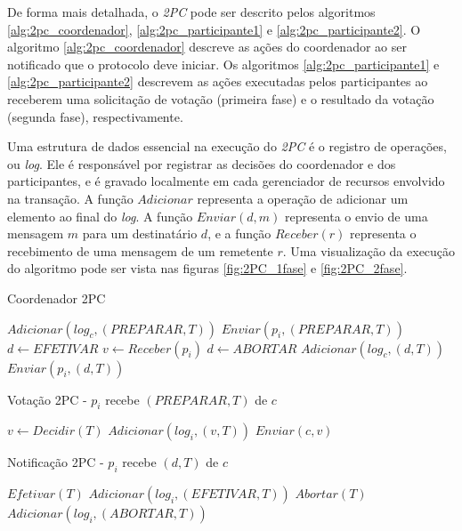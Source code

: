 \documentclass[11pt,twoside,a4paper]{book}
\begin{document}
De forma mais detalhada, o \emph{2PC} pode ser descrito pelos algoritmos \ref{alg:2pc_coordenador}, \ref{alg:2pc_participante1} e \ref{alg:2pc_participante2}. O algoritmo \ref{alg:2pc_coordenador} descreve as ações do coordenador ao ser notificado que o protocolo deve iniciar. Os algoritmos \ref{alg:2pc_participante1} e \ref{alg:2pc_participante2} descrevem as ações executadas pelos participantes ao receberem uma solicitação de votação (primeira fase) e o resultado da votação (segunda fase), respectivamente. 

Uma estrutura de dados essencial na execução do \emph{2PC} é o registro de operações, ou \emph{log}. Ele é responsável por registrar as decisões do coordenador e dos participantes, e é gravado localmente em cada gerenciador de recursos envolvido na transação. A função $Adicionar$ representa a operação de adicionar um elemento ao final do \emph{log}. A função $Enviar(d, m)$ representa o envio de uma mensagem $m$ para um destinatário $d$, e a função $Receber(r)$ representa o recebimento de uma mensagem de um remetente $r$. Uma visualização da execução do algoritmo pode ser vista nas figuras \ref{fig:2PC_1fase} e \ref{fig:2PC_2fase}.

\begin{algorithm}
\caption{Coordenador 2PC}
\label{alg:2pc_coordenador}
\begin{algorithmic}[1]
\State $Adicionar(log_c, (PREPARAR, T))$
	\State $Enviar(p_i, (PREPARAR, T))$
\EndFor
\State $d \gets EFETIVAR$
	\State $v \gets Receber(p_i)$
		\State $d \gets ABORTAR$
	\EndIf
\EndFor
\State $Adicionar(log_c, (d, T))$
	\State $Enviar(p_i, (d, T))$
\EndFor
\end{algorithmic}
\end{algorithm}

\begin{algorithm}
\caption{Votação 2PC - $p_i$ recebe $(PREPARAR, T)$ de $c$}
\label{alg:2pc_participante1}
\begin{algorithmic}[1]
\State $v \gets Decidir(T)$
\State $Adicionar(log_i, (v, T))$
\State $Enviar(c, v)$
\end{algorithmic}
\end{algorithm}

\begin{algorithm}
\caption{Notificação 2PC - $p_i$ recebe $(d, T)$ de $c$}
\label{alg:2pc_participante2}
\begin{algorithmic}[1]
	\State $Efetivar(T)$
	\State $Adicionar(log_i, (EFETIVAR, T))$
\Else
	\State $Abortar(T)$
	\State $Adicionar(log_i, (ABORTAR, T))$
\EndIf
\end{algorithmic}
\end{algorithm}
\end{document}
